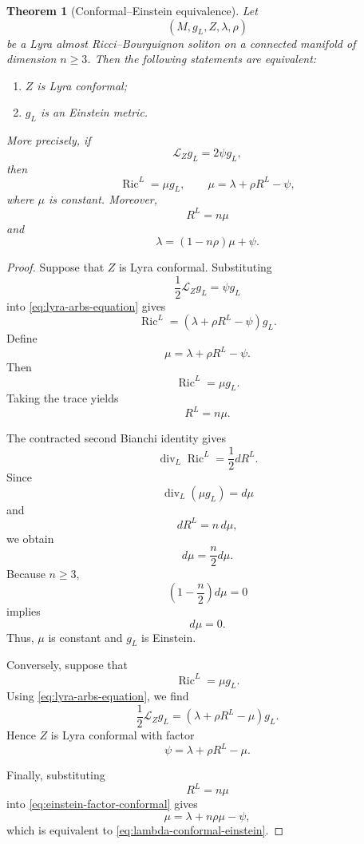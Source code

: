 \documentclass[10pt,a4paper]{amsart}
\newtheorem{theorem}{Theorem}
\begin{document}
\begin{theorem}[Conformal--Einstein equivalence]
	\label{thm:conformal-einstein-equivalence}
	Let
	\[
	\left(
	M,g_{L},Z,\lambda,\rho
	\right)
	\]
	be a Lyra almost Ricci--Bourguignon soliton on a connected
	manifold of dimension \(n\geq3\). Then the following statements
	are equivalent:
	\begin{enumerate}
		\item \(Z\) is Lyra conformal;
		\item \(g_{L}\) is an Einstein metric.
	\end{enumerate}
	
	More precisely, if
	\[
	\mathcal L_{Z}g_{L}=2\psi g_{L},
	\]
	then
	\begin{equation}
		\operatorname{Ric}^{L}
		=
		\mu g_{L},
		\qquad
		\mu
		=
		\lambda+\rho R^{L}-\psi,
		\label{eq:einstein-factor-conformal}
	\end{equation}
	where \(\mu\) is constant. Moreover,
	\begin{equation}
		R^{L}
		=
		n\mu
		\label{eq:einstein-scalar-curvature}
	\end{equation}
	and
	\begin{equation}
		\lambda
		=
		(1-n\rho)\mu+\psi.
		\label{eq:lambda-conformal-einstein}
	\end{equation}
\end{theorem}

\begin{proof}
	Suppose that \(Z\) is Lyra conformal. Substituting
	\[
	\frac12\mathcal L_{Z}g_{L}
	=
	\psi g_{L}
	\]
	into \eqref{eq:lyra-arbs-equation} gives
	\[
	\operatorname{Ric}^{L}
	=
	\left(
	\lambda+\rho R^{L}-\psi
	\right)g_{L}.
	\]
	Define
	\[
	\mu
	=
	\lambda+\rho R^{L}-\psi.
	\]
	Then
	\[
	\operatorname{Ric}^{L}
	=
	\mu g_{L}.
	\]
	Taking the trace yields
	\[
	R^{L}=n\mu.
	\]
	
	The contracted second Bianchi identity gives
	\[
	\operatorname{div}_{L}
	\operatorname{Ric}^{L}
	=
	\frac12 dR^{L}.
	\]
	Since
	\[
	\operatorname{div}_{L}(\mu g_{L})=d\mu
	\]
	and
	\[
	dR^{L}=n\,d\mu,
	\]
	we obtain
	\[
	d\mu
	=
	\frac n2 d\mu.
	\]
	Because \(n\geq3\),
	\[
	\left(
	1-\frac n2
	\right)d\mu=0
	\]
	implies
	\[
	d\mu=0.
	\]
	Thus, \(\mu\) is constant and \(g_{L}\) is Einstein.
	
	Conversely, suppose that
	\[
	\operatorname{Ric}^{L}
	=
	\mu g_{L}.
	\]
	Using \eqref{eq:lyra-arbs-equation}, we find
	\[
	\frac12\mathcal L_{Z}g_{L}
	=
	\left(
	\lambda+\rho R^{L}-\mu
	\right)g_{L}.
	\]
	Hence \(Z\) is Lyra conformal with factor
	\[
	\psi
	=
	\lambda+\rho R^{L}-\mu.
	\]
	
	Finally, substituting
	\[
	R^{L}=n\mu
	\]
	into \eqref{eq:einstein-factor-conformal} gives
	\[
	\mu
	=
	\lambda+n\rho\mu-\psi,
	\]
	which is equivalent to
	\eqref{eq:lambda-conformal-einstein}.
\end{proof}
\end{document}
